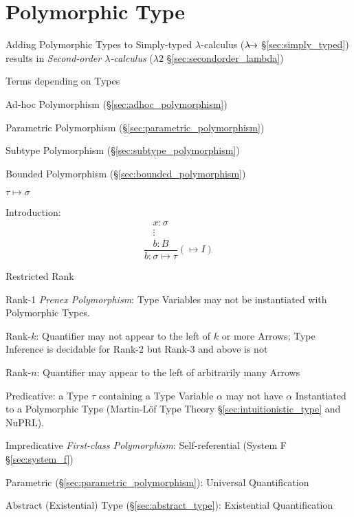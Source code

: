 \section{Polymorphic Type}\label{sec:polymorphic_type}

Adding Polymorphic Types to Simply-typed $\lambda$-calculus
($\lambda\kern-5pt\rightarrow$ \S\ref{sec:simply_typed}) results in
\emph{Second-order $\lambda$-calculus} ($\lambda2$
\S\ref{sec:secondorder_lambda})

Terms depending on Types


Ad-hoc Polymorphism (\S\ref{sec:adhoc_polymorphism})

Parametric Polymorphism (\S\ref{sec:parametric_polymorphism})

Subtype Polymorphism (\S\ref{sec:subtype_polymorphism})

Bounded Polymorphism (\S\ref{sec:bounded_polymorphism})


\asterism


$\tau \mapsto \sigma$

Introduction:
\[
  {
  \frac{
    \begin{matrix}
      x : \sigma \\
      \vdots \\
      b : B
    \end{matrix}
  }
  {b : \sigma \mapsto \tau}
  }(\mapsto I)
\]


\asterism


Restricted Rank

Rank-1 \emph{Prenex Polymorphism}: Type Variables may not be
instantiated with Polymorphic Types.

Rank-$k$: Quantifier may not appear to the left of $k$ or more Arrows;
Type Inference is decidable for Rank-2 but Rank-3 and above is not

Rank-$n$: Quantifier may appear to the left of arbitrarily many Arrows

Predicative: a Type $\tau$ containing a Type Variable $\alpha$ may not
have $\alpha$ Instantiated to a Polymorphic Type (Martin-L\"of Type
Theory \S\ref{sec:intuitionistic_type} and NuPRL).

Impredicative \emph{First-class Polymorphism}: Self-referential
(System F \S\ref{sec:system_f})

Parametric (\S\ref{sec:parametric_polymorphism}): Universal
Quantification

Abstract (Existential) Type (\S\ref{sec:abstract_type}): Existential
Quantification

